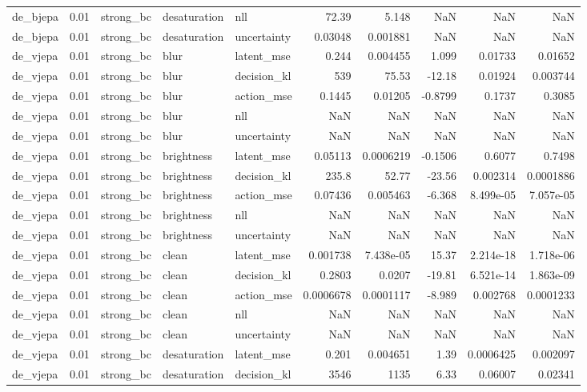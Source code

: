 \begin{tabular}{lrlllrrrrr}
de\_bjepa & 0.01 & strong\_bc & desaturation & nll & 72.39 & 5.148 & NaN & NaN & NaN \\
de\_bjepa & 0.01 & strong\_bc & desaturation & uncertainty & 0.03048 & 0.001881 & NaN & NaN & NaN \\
de\_vjepa & 0.01 & strong\_bc & blur & latent\_mse & 0.244 & 0.004455 & 1.099 & 0.01733 & 0.01652 \\
de\_vjepa & 0.01 & strong\_bc & blur & decision\_kl & 539 & 75.53 & -12.18 & 0.01924 & 0.003744 \\
de\_vjepa & 0.01 & strong\_bc & blur & action\_mse & 0.1445 & 0.01205 & -0.8799 & 0.1737 & 0.3085 \\
de\_vjepa & 0.01 & strong\_bc & blur & nll & NaN & NaN & NaN & NaN & NaN \\
de\_vjepa & 0.01 & strong\_bc & blur & uncertainty & NaN & NaN & NaN & NaN & NaN \\
de\_vjepa & 0.01 & strong\_bc & brightness & latent\_mse & 0.05113 & 0.0006219 & -0.1506 & 0.6077 & 0.7498 \\
de\_vjepa & 0.01 & strong\_bc & brightness & decision\_kl & 235.8 & 52.77 & -23.56 & 0.002314 & 0.0001886 \\
de\_vjepa & 0.01 & strong\_bc & brightness & action\_mse & 0.07436 & 0.005463 & -6.368 & 8.499e-05 & 7.057e-05 \\
de\_vjepa & 0.01 & strong\_bc & brightness & nll & NaN & NaN & NaN & NaN & NaN \\
de\_vjepa & 0.01 & strong\_bc & brightness & uncertainty & NaN & NaN & NaN & NaN & NaN \\
de\_vjepa & 0.01 & strong\_bc & clean & latent\_mse & 0.001738 & 7.438e-05 & 15.37 & 2.214e-18 & 1.718e-06 \\
de\_vjepa & 0.01 & strong\_bc & clean & decision\_kl & 0.2803 & 0.0207 & -19.81 & 6.521e-14 & 1.863e-09 \\
de\_vjepa & 0.01 & strong\_bc & clean & action\_mse & 0.0006678 & 0.0001117 & -8.989 & 0.002768 & 0.0001233 \\
de\_vjepa & 0.01 & strong\_bc & clean & nll & NaN & NaN & NaN & NaN & NaN \\
de\_vjepa & 0.01 & strong\_bc & clean & uncertainty & NaN & NaN & NaN & NaN & NaN \\
de\_vjepa & 0.01 & strong\_bc & desaturation & latent\_mse & 0.201 & 0.004651 & 1.39 & 0.0006425 & 0.002097 \\
de\_vjepa & 0.01 & strong\_bc & desaturation & decision\_kl & 3546 & 1135 & 6.33 & 0.06007 & 0.02341 \\

\end{tabular}
